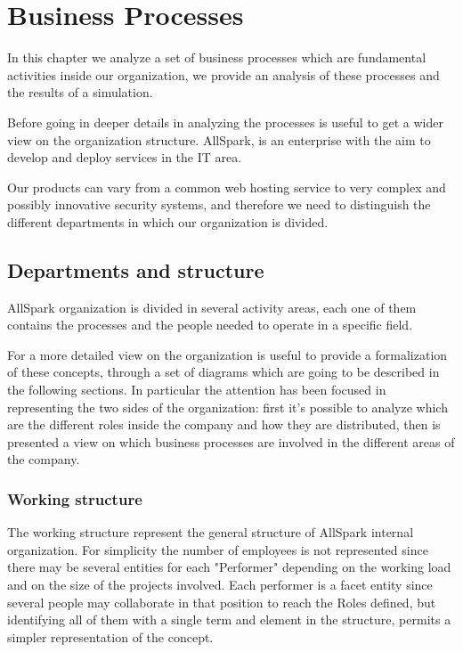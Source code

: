 \chapter{Business Processes}
In this chapter we analyze a set of business processes which are
fundamental activities inside our organization, we provide an analysis of
these processes and the results of a simulation.

Before going in deeper details in analyzing the processes is useful to get
a wider view on the organization structure.
AllSpark, is an enterprise with the aim to develop and deploy services in
the IT area.

Our products can vary from a common web hosting service to very complex and
possibly innovative security systems, and therefore we need to distinguish
the different departments in which our organization is divided.

\section{Departments and structure}
AllSpark organization is divided in several activity areas, each one of them
contains the processes and the people needed to operate in a specific
field. 

For a more detailed view on the organization is useful to provide a
formalization of these concepts, through a set of diagrams which are going
to be described in the following sections. In particular the attention has
been focused in representing the two sides of the organization: first it's
possible to analyze which are the different roles inside the company and
how they are distributed, then is presented a view on which business
processes are involved in the different areas of the company.

\subsection{Working structure}
The working structure represent the general structure of AllSpark internal
organization. For simplicity the number of employees is not represented
since there may be several entities for each "Performer" depending on the
working load and on the size of the projects involved. Each performer is a
facet entity since several people may collaborate in that position to reach
the Roles defined, but identifying all of them with a single term and
element in the structure, permits a simpler representation of the concept.

